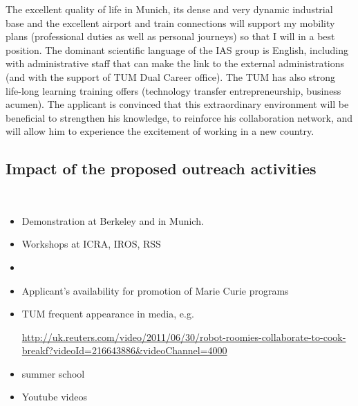 The excellent  quality of life in  Munich, its
dense and very  dynamic industrial base and the  excellent airport and
train connections will support  my mobility plans (professional duties
as well as  personal journeys) so that I will in  a best position. The
dominant scientific  language of the IAS group  is English, including
with  administrative staff  that can  make  the link  to the  external
administrations (and with the support  of TUM Dual Career office). The
TUM  has also  strong life-long  learning training  offers (technology
transfer entrepreneurship, business acumen).   The applicant is convinced that this
extraordinary  environment   will  be  beneficial   to  strengthen  his
knowledge, to reinforce his collaboration network, and will allow him to
experience the excitement of working in a new country.
\subsection{Impact of the proposed outreach activities}
\\
\begin{itemize}
\item Demonstration at Berkeley and in Munich.
\item Workshops at ICRA, IROS, RSS
\item {}
\item Applicant's availability for promotion of Marie Curie programs
\item TUM frequent appearance in media, e.g.\\
\begin{small} \url{http://uk.reuters.com/video/2011/06/30/robot-roomies-collaborate-to-cook-breakf?videoId=216643886&videoChannel=4000} \end{small}
\item summer school
\item Youtube videos
\end{itemize}
\newpage